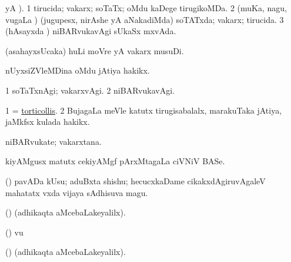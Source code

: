 \begin{center}
\bentry
{} 
\gl{\gu}
 yA ).
\bmng
\bnum
\num{1} tirucida; vakarx; soTaTx; oMdu kaDege tirugikoMDa. 
\num{2} (muKa, nagu, \mo vugaLa \vi) (jugupesx, nirAshe yA aNakadiMda) soTATxda; vakarx; tirucida. 
\num{3} (hAsayxda \vi) niBARvukavAgi sUkaSx mxvAda. 
\enum
\emng

\noindent
\gl{\pagu}
\expl{}
\bmng
{} (asahayxsUcaka) huLi moVre yA vakarx musuDi. 
\emng
\eentry

\bentry
{} 
\gl{\nA}
\expl{}
\bmng
nUyxsiZVleMDina oMdu jAtiya hakikx. 
\emng
\eentry

\bentry
{} 
\gl{\kirxvi}
\expl{}
\bmng
\bnum
\num{1} soTaTxnAgi; vakarxvAgi. 
\num{2} niBARvukavAgi. 
\enum
\emng
\eentry

\bentry
{} 
\gl{\nA}
\expl{}
\bmng
\bnum
\num{1} = \hyperref{kandict_t.pdf}{T}{torticollis}{torticollis}. 
\num{2} BujagaLa meVle katutx tirugisabalalx, marakuTaka jAtiya, jaMkfsx kulada hakikx. 
\enum
\emng
\eentry

\bentry
{} 
\gl{\nA}
\expl{}
\bmng
niBARvukate; vakarxtana. 
\emng
\eentry

\bentry
{} 
\gl{\saMkiSx}
\expl{}
\bmng
{} 
\emng
\eentry

\bentry
{} 
\gl{\saMkiSx}
\expl{}
\bmng
{} 
\emng
\eentry

\bentry
{} 
\gl{\nA}
\expl{}
\bmng
kiyAMgusx matutx cekiyAMgf pArxMtagaLa ciVNiV BASe. 
\emng
\eentry

\bentry
{} 
\gl{\nA}
\expl{}
\bmng
(\AmA) pavADa kUsu; aduBxta shishu; hecucxkaDame cikakxdAgiruvAgaleV mahatatx vxda vijaya sAdhisuva magu. 
\emng
\eentry

\bentry
{} 
\gl{\saMkiSx}
\expl{}
\bmng
(\ame)  (adhikaqta aMcebaLakeyalilx). 
\emng
\eentry

\bentry
{} 
\gl{\saMkiSx}
\expl{}
\bmng
(\ame)  \mo vu 
\emng
\eentry

\bentry
{} 
\gl{\saMkiSx}
\expl{}
\bmng
{} 
\emng
\eentry

\bentry
{} 
\gl{\saMkiSx}
\expl{}
\bmng
(\ame)  (adhikaqta aMcebaLakeyalilx). 
\emng
\eentry


\end{center}

